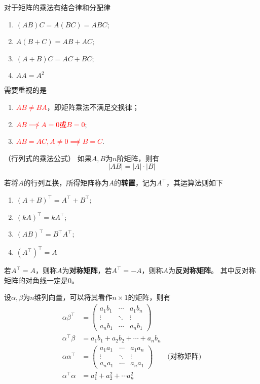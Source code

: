 对于矩阵的乘法有结合律和分配律
\begin{enumerate}[(1)]
    \item $(AB)C=A(BC)=ABC$;
    \item $A(B+C)=AB+AC$;
    \item $(A+B)C=AC+BC$;
    \item $AA=A^2$
\end{enumerate}

需要重视的是
\begin{enumerate}[(1)]
    \item \textcolor{red}{$AB \neq BA$}，即矩阵乘法不满足交换律；
    \item \textcolor{red}{$AB \not\implies A=0 \text{或} B=0$};
    \item \textcolor{red}{$AB=AC,A\neq 0 \not\implies B = C$}.
\end{enumerate}

\begin{theorem}
    \label{th:行列式的乘法公式}
    （行列式的乘法公式）
    如果$A,B$为$n$阶矩阵，则有
    \[ |AB| = |A|\cdot|B| \]
\end{theorem}

若将$A$的行列互换，所得矩阵称为$A$的\textbf{\textsf{转置}}，记为$A^\intercal$，其运算法则如下
\begin{enumerate}[(1)]
    \item $(A+B)^\intercal = A^\intercal + B^\intercal$;
    \item $(kA)^\intercal = kA^\intercal$;
    \item $(AB)^\intercal = B^\intercal A^\intercal$;
    \item $(A^\intercal)^\intercal=A$
\end{enumerate}
若$A^\intercal = A$，则称$A$为\textbf{\textsf{对称矩阵}}，若$A^\intercal = - A$，则称$A$为\textbf{\textsf{反对称矩阵}}。
其中反对称矩阵的对角线一定是$0$。


设$\alpha,\beta$为$n$维列向量，可以将其看作$n\times 1$的矩阵，则有
\begin{align}
    \alpha\beta^\intercal  & =
    \begin{pmatrix}
        a_1b_1 & \cdots & a_1b_n \\
        \vdots & \ddots & \vdots \\
        a_nb_1 & \cdots & a_nb_1
    \end{pmatrix}                                  \\
    \alpha^\intercal\beta  & = a_1b_1+a_2b_2 + \cdots + a_nb_n \\
    \alpha\alpha^\intercal & =
    \begin{pmatrix}
        a_1a_1 & \cdots & a_1a_n \\
        \vdots & \ddots & \vdots \\
        a_na_1 & \cdots & a_na_1
    \end{pmatrix}\qquad\text{(对称矩阵)}          \\
    \alpha^\intercal\alpha & = a_1^2 + a_2^2 + \cdots a_n^2
\end{align}

